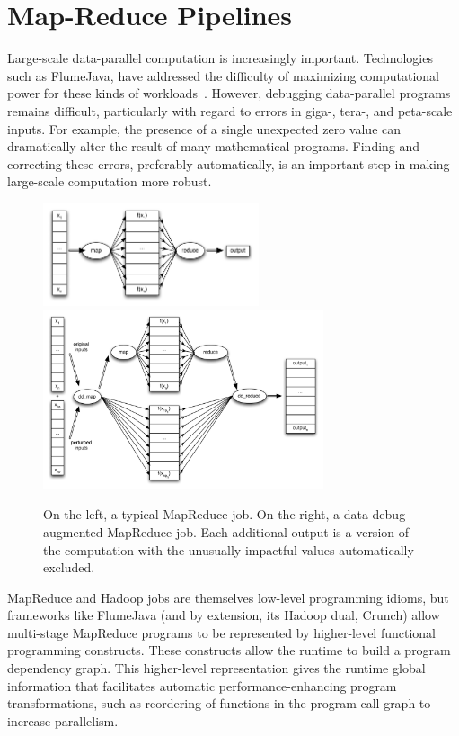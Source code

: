 \section{Map-Reduce Pipelines}
Large-scale data-parallel computation is increasingly important.  Technologies such as FlumeJava, have addressed the difficulty of maximizing computational power for these kinds of workloads~\cite{pldi:flumejava}.  However, debugging data-parallel programs remains difficult, particularly with regard to errors in giga-, tera-, and peta-scale inputs.  For example, the presence of a single unexpected zero value can dramatically alter the result of many mathematical programs.  Finding and correcting these errors, preferably automatically, is an important step in making large-scale computation more robust.

\begin{figure}[t]
	\includegraphics[width=2.5in]{images/mapreduce}
  \hfill
	\includegraphics[width=3.25in]{images/mapreduce_dd}
	\caption{
		On the left, a typical MapReduce job.  On the right, a data-debug-augmented MapReduce job.  Each additional output is a version of the computation with the unusually-impactful values automatically excluded.\label{fig:mapreduce_pipeline}
	}
\end{figure}

MapReduce and Hadoop jobs are themselves low-level programming idioms, but frameworks like FlumeJava (and by extension, its Hadoop dual, Crunch) allow multi-stage MapReduce programs to be represented by higher-level functional programming constructs.  These constructs allow the runtime to build a program dependency graph.  This higher-level representation gives the runtime global information that facilitates automatic performance-enhancing program transformations, such as reordering of functions in the program call graph to increase parallelism.

